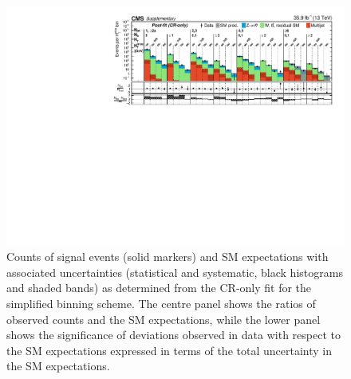 \begin{figure}[h!]
  \centering
  \includegraphics[width=0.95\linewidth]{Supplementary/SimplifiedBinning_results_cr-only-fit_aux} 
  \caption{Counts of signal events (solid markers) and SM expectations
    with associated uncertainties (statistical and systematic, black
    histograms and shaded bands) 
    as determined from the CR-only fit
    for the simplified binning scheme.
    The centre panel shows the ratios of
    observed counts and the SM expectations, while the lower panel
    shows the significance of deviations observed in data with respect
    to the SM expectations expressed in terms of the total uncertainty
    in the SM expectations.
    }
  \label{fig:aggregated_results}
\end{figure}

